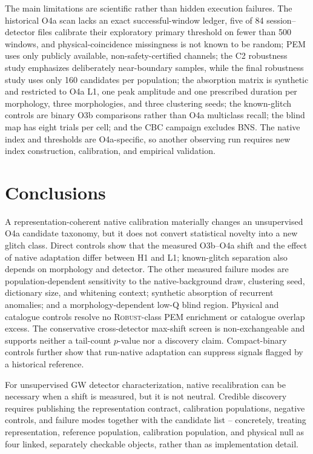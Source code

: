 \documentclass[12pt]{article}
\newcommand{\robust}{\textsc{Robust}}
\begin{document}
The main limitations are scientific rather than hidden execution failures.
The historical O4a scan lacks an exact successful-window ledger, five of 84
session--detector files calibrate their exploratory primary threshold on fewer
than 500 windows, and physical-coincidence missingness is not known to be
random; PEM uses only
publicly available, non-safety-certified channels; the C2 robustness study
emphasizes deliberately near-boundary samples, while the final robustness
study uses only 160 candidates per population; the absorption matrix is
synthetic and restricted to O4a L1, one peak amplitude and one prescribed
duration per morphology, three
morphologies, and three clustering seeds; the known-glitch controls are binary
O3b comparisons rather than O4a multiclass recall; the blind map has eight
trials per cell; and the CBC campaign excludes BNS.  The native index and
thresholds are O4a-specific, so another observing run requires new index
construction, calibration, and empirical validation.

\section{Conclusions}

A representation-coherent native calibration materially changes an
unsupervised O4a candidate taxonomy, but it does not convert statistical
novelty into a new glitch class.  Direct controls show that the measured
O3b--O4a shift and the effect of native adaptation differ between H1 and L1;
known-glitch separation also depends on morphology and detector.  The other
measured failure modes are population-dependent sensitivity to the
native-background draw, clustering seed, dictionary size, and whitening
context; synthetic absorption of recurrent anomalies; and a
morphology-dependent low-Q blind region.  Physical and catalogue controls
resolve no \robust-class PEM enrichment or catalogue overlap excess.  The
conservative cross-detector max-shift screen is non-exchangeable and supports
neither a tail-count $p$-value nor a discovery claim.  Compact-binary controls
further show that run-native
adaptation can suppress signals flagged by a historical reference.

For unsupervised GW detector characterization, native recalibration can be
necessary when a shift is measured, but it is not neutral.  Credible discovery requires publishing the
representation contract, calibration populations, negative controls, and
failure modes together with the candidate list -- concretely, treating
representation, reference population, calibration population, and physical
null as four linked, separately checkable objects, rather than as implementation
detail.
\end{document}
